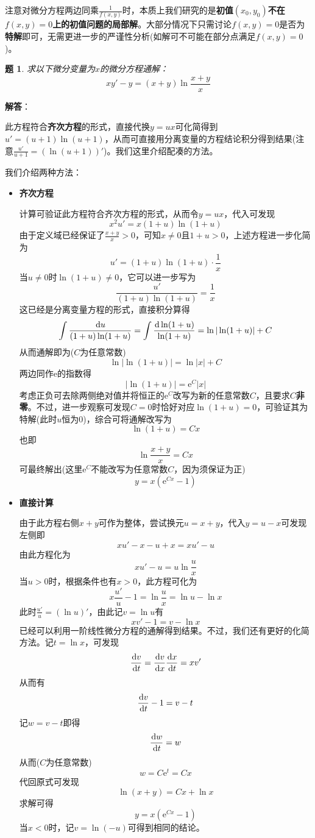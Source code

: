 \documentclass[a4paper,UTF8,fontset=windows,AutoFakeBold]{ctexart}
\newcommand*{\dr}{\hspace{0.07em}\mathrm{d}}
\newcommand*{\er}{\mathrm{e}}
\newcommand*{\note}{\noindent *}
\theoremstyle{ex}
\newtheorem{exercise}{题}
\newcommand{\sol}[1]{{\vspace{5pt}\kaishu\noindent\textbf{解答}：\vspace{-3pt}
\begin{compactitem}
    \item[] #1
\end{compactitem}
}}
\begin{document}
\note 注意对微分方程两边同乘$\frac{1}{f(x,y)}$时，本质上我们研究的是\textbf{初值$(x_0,y_0)$不在$f(x,y)=0$上的初值问题的局部解}。大部分情况下只需讨论$f(x,y)=0$是否为\textbf{特解}即可，无需更进一步的严谨性分析(如解可不可能在部分点满足$f(x,y)=0$)。

\begin{framed}
\begin{exercise}
    求以下微分变量为$x$的微分方程通解：
    $$xy'-y=(x+y)\ln\frac{x+y}{x}$$
\end{exercise}
\sol{
    \note 此方程符合\textbf{齐次方程}的形式，直接代换$y=ux$可化简得到$u'=(u+1)\ln(u+1)$，从而可直接用分离变量的方程结论积分得到结果(注意$\frac{u'}{u+1}=(\ln(u+1))'$)。我们这里介绍配凑的方法。
    
    我们介绍两种方法：
    \begin{itemize}
        \item \textbf{齐次方程}
        
        计算可验证此方程符合齐次方程的形式，从而令$y=ux$，代入可发现
        $$x^2u'=x(1+u)\ln(1+u)$$
        由于定义域已经保证了$\frac{x+y}{x}>0$，可知$x\ne0$且$1+u>0$，上述方程进一步化简为
        $$u'=(1+u)\ln(1+u)\cdot\frac{1}{x}$$
        当$u\ne0$时$\ln(1+u)\ne0$，它可以进一步写为
        $$\frac{u'}{(1+u)\ln(1+u)}=\frac{1}{x}$$
        这已经是分离变量方程的形式，直接积分算得
        $$\int\frac{\dr u}{(1+u)\ln(1+u)}=\int\frac{\dr\ln(1+u)}{\ln(1+u)}=\ln|\ln(1+u)|+C$$
        从而通解即为($C$为任意常数)
        $$\ln|\ln(1+u)|=\ln|x|+C$$
        两边同作$\er$的指数得
        $$|\ln(1+u)|=\er^C|x|$$
        考虑正负可去除两侧绝对值并将恒正的$\er^C$改写为新的任意常数$C$，且要求$C$\textbf{非零}。不过，进一步观察可发现$C=0$时恰好对应$\ln(1+u)=0$，可验证其为特解(此时$u$恒为0)，综合可将通解改写为
        $$\ln(1+u)=Cx$$
        也即
        $$\ln\frac{x+y}{x}=Cx$$
        可最终解出(这里$\er^C$不能改写为任意常数$C$，因为须保证为正)
        $$y=x(\er^{Cx}-1)$$

        \item \textbf{直接计算}
        
        由于此方程右侧$x+y$可作为整体，尝试换元$u=x+y$，代入$y=u-x$可发现左侧即
        $$xu'-x-u+x=xu'-u$$
        由此方程化为
        $$xu'-u=u\ln\frac{u}{x}$$
        当$u>0$时，根据条件也有$x>0$，此方程可化为
        $$x\frac{u'}{u}-1=\ln\frac{u}{x}=\ln u-\ln x$$
        此时$\frac{u'}{u}=(\ln u)'$，由此记$v=\ln u$有
        $$xv'-1=v-\ln x$$
        已经可以利用一阶线性微分方程的通解得到结果。不过，我们还有更好的化简方法。记$t=\ln x$，可发现
        $$\frac{\dr v}{\dr t}=\frac{\dr v}{\dr x}\frac{\dr x}{\dr t}=xv'$$
        从而有
        $$\frac{\dr v}{\dr t}-1=v-t$$
        记$w=v-t$即得
        $$\frac{\dr w}{\dr t}=w$$
        从而($C$为任意常数)
        $$w=C\er^t=Cx$$
        代回原式可发现
        $$\ln(x+y)=Cx+\ln x$$
        求解可得
        $$y=x(\er^{Cx}-1)$$
        当$x<0$时，记$v=\ln(-u)$可得到相同的结论。


\end{itemize}}
\end{framed}
\end{document}
